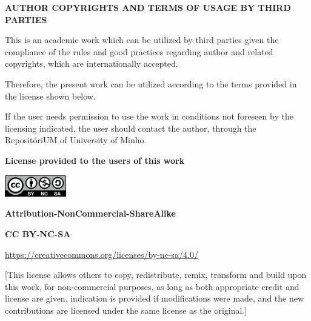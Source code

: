 \begin{center}
    \textbf{AUTHOR COPYRIGHTS AND TERMS OF USAGE BY THIRD PARTIES}
\end{center}

    This is an academic work which can be utilized by third parties given the compliance of the rules and good practices regarding author and related copyrights, which are internationally accepted.
        
    Therefore, the present work can be utilized according to the terms provided in the license shown below.
        
    If the user needs permission to use the work in conditions not foreseen by the licensing indicated, the user should contact the author, through the RepositóriUM of University of Minho.
        
    \bigskip
    
    \textbf{License provided to the users of this work}
    
    \bigskip
    
    \includegraphics[width=0.2\textwidth]{img/copyright.png}
    
    \textbf{Attribution-NonCommercial-ShareAlike}
    
    \textbf{CC BY-NC-SA}
    
    \url{https://creativecommons.org/licenses/by-nc-sa/4.0/}
    
    [This license allows others to copy, redistribute, remix, transform and build upon this work, for non-commercial purposes, as long as both appropriate credit and license are given, indication is provided if modifications were made, and the new contributions are licensed under the same license as the original.]
      
